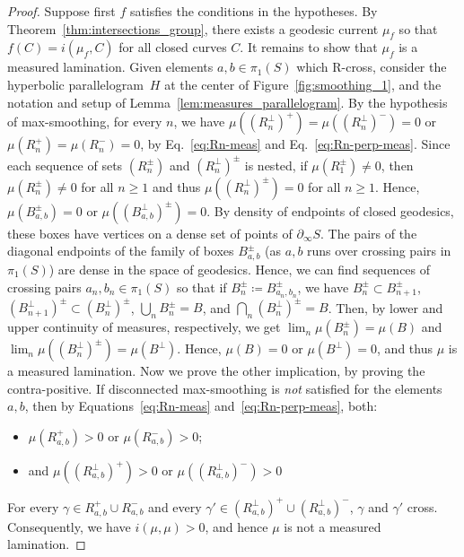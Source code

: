 \documentclass[11pt]{amsart}
\numberwithin{equation}{section}
\numberwithin{figure}{section}
\theoremstyle{definition}
\theoremstyle{plain}
\begin{document}
\begin{proof}
Suppose first $f$ satisfies the conditions in the hypotheses.
By Theorem~\ref{thm:intersections_group}, there exists a geodesic current $\mu_f$ so that $f(C)=i(\mu_f,C)$ for all closed curves $C$.
It remains to show that $\mu_f$ is a measured lamination.
Given elements $a, b \in \pi_1(S)$ which R-cross,
consider the hyperbolic parallelogram~$H$ at the center of
Figure~\ref{fig:smoothing_1}, and the notation and setup of Lemma~\ref{lem:measures_parallelogram}.
By the hypothesis of max-smoothing, for every $n$, we have $\mu((R_n^\perp)^+)=\mu((R_n^\perp)^-)=0$ or $\mu(R_n^{+})=\mu(R_n^{-})=0$, by Eq.~\eqref{eq:Rn-meas} and Eq.~\eqref{eq:Rn-perp-meas}.
Since each sequence of sets $(R_n^{\pm})$ and $(R_n^{\perp})^{\pm}$ is nested, if $\mu(R_1^{\pm}) \neq 0$, then $\mu(R_n^{\pm}) \neq 0$ for all $n \geq 1$ and thus $\mu((R_n^{\perp})^{\pm})=0$ for all $n \geq 1$.
Hence, $\mu(B_{a,b}^{\pm})=0$ or $\mu((B_{a,b}^{\perp})^{\pm})=0$.
By density of endpoints of closed geodesics, these boxes have vertices on a dense set of points of $\partial_{\infty} S$.
The pairs of the diagonal endpoints of the family of boxes $B_{a,b}^{\pm}$ (as $a,b$ runs over crossing pairs in $\pi_1(S)$) are dense in the space of geodesics. Hence, we can find sequences of crossing pairs $a_n, b_n \in \pi_1(S)$ so that if $B_n^{\pm} \coloneqq B_{a_n, b_n}^{\pm}$, we have $B_n^{\pm} \subset B_{n+1}^{\pm}$, $(B_{n+1}^{\perp})^{\pm} \subset (B_{n}^{\perp})^{\pm}$, $\bigcup_n B_n^{\pm} = B$, and $\bigcap_n (B_n^{\perp})^{\pm} = B$.
Then, by lower and upper continuity of measures, respectively, we get $\lim_n \mu(B_n^{\pm}) =\mu(B)$ and $\lim_n \mu((B_n^{\perp})^{\pm}) = \mu(B^{\perp})$. Hence, $\mu(B)=0$ or $\mu(B^{\perp})=0$, and thus $\mu$ is a measured lamination.
Now we prove the other implication, by proving the contra-positive.
If disconnected max-smoothing is \emph{not} satisfied for the elements
$a,b$, then by Equations~\eqref{eq:Rn-meas}
and~\eqref{eq:Rn-perp-meas}, both:

\begin{itemize}
    \item $\mu(R_{a,b}^{+})>0$ or $\mu(R_{a,b}^{-})>0$;
    \item and
$\mu((R_{a,b}^{\perp})^{+})>0$ or $\mu((R_{a,b}^{\perp})^{-})>0$
\end{itemize} 
For every $\gamma \in R_{a,b}^+ \cup R_{a,b}^-$ and every $\gamma' \in (R_{a,b}^\perp)^+\cup (R_{a,b}^\perp)^-$, $\gamma$ and $\gamma'$ cross. Consequently, we have $i(\mu, \mu) >0$,
and hence $\mu$ is not a measured lamination.
\end{proof}
\end{document}
